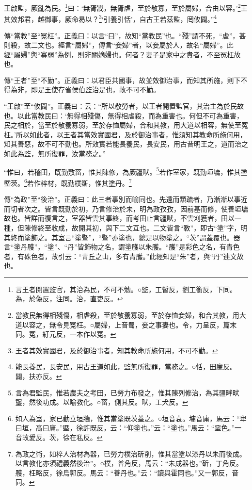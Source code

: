 王啟監，厥亂為民。\footnote{言王者開置監官，其治為民，不可不勉。○監，工暫反，劉工銜反，下同。為，於偽反，注同。治，直吏反。}曰：‘無胥戕，無胥虐，至於敬寡，至於屬婦，合由以容。’\footnote{當教民無得相殘傷，相虐殺，至於敬養寡弱，至於存恤妾婦，和合其教，用大道以容之，無令見冤枉。○屬婦，上音蜀，妾之事妻也。令，力呈反，篇末同。冤，紆元反，一本作以冤。}王其效邦君，越御事，厥命曷以？\footnote{王者其效實國君，及於御治事者，知其教命所施何用，不可不勤。}‘引養引恬’，自古王若茲監，罔攸闢。”\footnote{能長養民，長安民，用古王道如此，監無所復罪，當務之。○恬，田廉反。闢，扶亦反。}

{\noindent\zhuan{}\fzbyks 傳“當教”至“冤枉”。正義曰：以言“曰”，故知“當教民”也。“殘”謂不死，“虐”，甚則殺，故二文也。經言“屬婦”，傳言“妾婦”者，以妾屬於人，故名“屬婦”。此經“屬婦”與“寡弱”為例，則非關嫡婦也。何者？妻子是家中之貴者，不至冤枉故也。 \par}

{\noindent\zhuan{}\fzbyks 傳“王者”至“不勤”。正義曰：以君臣共國事，故並效御治事，而知其所施，則下不得為非，即是王使存省侯伯監治是也，故不可不勤。 \par}

{\noindent\shu{}\fzkt “王啟”至“攸闢”。正義曰：云：“所以敬勞者，以王者開置監官，其治主為於民故也。以此當教民曰：‘無得相殘傷，無得相虐殺，而為重害也。何但不可為重害，民之相於，當至於敬養寡弱，至於存恤屬婦，合和其教，用大道以相容，無使至冤枉。’所以如此者，以王者其當效實國君，及於御治事者，惟須知其教命所施何用，知其善惡，故不可不勤也。所效實若能長養民，長安民，用古昔明王之，道而治之如此為監，無所復罪，汝當務之。” \par}

“惟曰，若稽田，既勤敷菑，惟其陳修，為厥疆畎。\footnote{言為君監民，惟若農夫之考田，已勞力布發之，惟其陳列修治，為其疆畔畎壟，然後功成。以喻教化。○菑，側其反。畎，工犬反。}若作室家，既勤垣墉，惟其塗塈茨。\footnote{如人為室，家已勤立垣牆，惟其當塗既茨蓋之。○垣音袁。墉音庸，馬云：“卑曰垣，高曰庸。”塈，徐許既反，云：“仰塗也。”云：“塗也。”馬云：“堊色。”一音故愛反。茨，徐在私反。}若作梓材，既勤樸斲，惟其塗丹。\footnote{為政之術，如梓人治材為器，已勞力樸治斫削，惟其當塗以漆丹以朱而後成。以言教化亦須禮義然後治”。○樸，普角反，馬云：“未成器也。”斫，丁角反。雘，枉略反，徐烏郭反。馬云：“善丹也。”云：“讀與霍同也。”又一郭反，音同。}


{\noindent\zhuan{}\fzbyks 傳“為政”至“後治”。正義曰：此三者事別而喻同也。先遠而類疏者，乃漸漸以事近而切者次之。皆言既勤於初，乃言修治於未，明為政孜孜，因前基而修，使善垣墉故也。皆詳而復言之，室器皆雲其事終，而考田止言疆畎，不雲刈獲者，田以一種，但陳修終至收成，故開其初，與下二文互也。二文皆言“斁”，即古“塗”字，明其終而塗飾之。其室言“塗暨”，“暨”亦塗也，總是以物塗之。“茨”謂蓋覆也。器言“塗丹雘”，“塗”、“丹”皆飾物之名，謂塗雘以朱雘。“雘”是彩色之名，有青色者，有硃色者，故引云：“青丘之山，多有青雘。”此經知是“朱”者，與“丹”連文故也。 \par}

